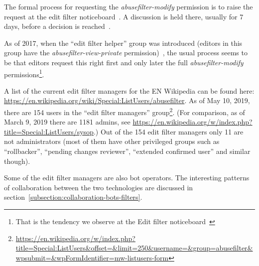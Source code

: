 The formal process for requesting the \emph{abusefilter-modify} permission is to raise the request at the edit filter noticeboard~\cite{Wikipedia:EditFilterNoticeboard}.
A discussion is held there, usually for 7 days, before a decision is reached~\cite{Wikipedia:EditFilter}.

As of 2017, when the ``edit filter helper'' group was introduced (editors in this group have the \emph{abusefilter-view-private} permission)~\cite{Wikipedia:EditFilterHelper},
the usual process seems to be that editors request this right first and only later the full \emph{abusefilter-modify} permissions\footnote{That is the tendency we observe at the Edit filter noticeboard~\cite{Wikipedia:EditFilterNoticeboard}}.

A list of the current edit filter managers for the EN Wikipedia can be found here: \url{https://en.wikipedia.org/wiki/Special:ListUsers/abusefilter}.
As of May 10, 2019, there are 154 users in the ``edit filter managers'' group\footnote{\url{https://en.wikipedia.org/w/index.php?title=Special:ListUsers&offset=&limit=250&username=&group=abusefilter&wpsubmit=&wpFormIdentifier=mw-listusers-form}}.
(For comparison, as of March 9, 2019 there are 1181 admins, see \url{https://en.wikipedia.org/w/index.php?title=Special:ListUsers/sysop}.)
Out of the 154 edit filter managers only 11 are not administrators (most of them have other privileged groups such as ``rollbacker'', ``pending changes reviewer'', ``extended confirmed user'' and similar though).

Some of the edit filter managers are also bot operators.
The interesting patterns of collaboration between the two technologies are discussed in section~\ref{subsection:collaboration-bots-filters}.

